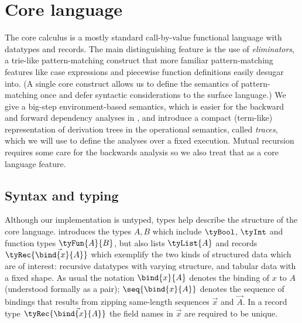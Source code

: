 \section{Core language}
\label{sec:core-language}

The core calculus is a mostly standard call-by-value functional language with datatypes and records. The main distinguishing feature is the use of \emph{eliminators}, a trie-like pattern-matching construct that more familiar pattern-matching features like case expressions and piecewise function definitions easily desugar into. (A single core construct allows us to define the semantics of pattern-matching once and defer syntactic considerations to the surface language.) We give a big-step environment-based semantics, which is easier for the backward and forward dependency analyses in , and introduce a compact (term-like) representation of derivation trees in the operational semantics, called \emph{traces}, which we will use to define the analyses over a fixed execution. Mutual recursion requires some care for the backwards analysis so we also treat that as a core language feature.

\subsection{Syntax and typing}
\label{sec:core-language:syntax-typing}

Although our implementation is untyped, types help describe the structure of the core language.  introduces the types $A, B$ which include $\tyBool$, $\tyInt$ and function types $\tyFun{A}{B}$, but also lists $\tyList{A}$ and records $\tyRec{\vec{\bind{x}{A}}}$ which exemplify the two kinds of structured data which are of interest: recursive datatypes with varying structure, and tabular data with a fixed shape. As usual the notation $\bind{x}{A}$ denotes the binding of $x$ to $A$ (understood formally as a pair); $\seq{\bind{x}{A}}$ denotes the sequence of bindings that results from zipping same-length sequences $\vec{x}$ and $\vec{A}$. In a record type $\tyRec{\vec{\bind{x}{A}}}$ the field names in $\vec{x}$ are required to be unique.



